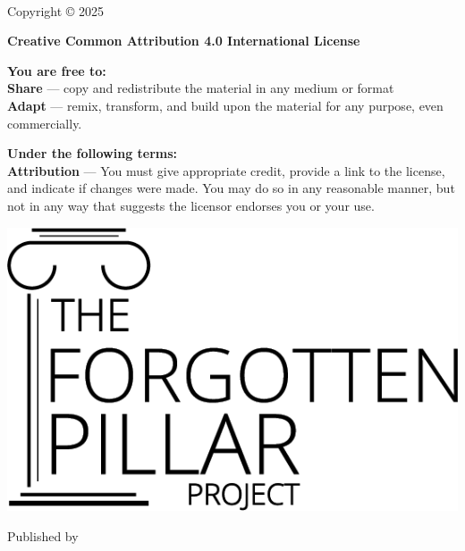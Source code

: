 \clearpage %

{\small
\setlength{\parindent}{0em}\setlength{\parskip}{1em}
~
\vfill

Copyright \copyright{} 2025 \website

\textbf{Creative Common Attribution 4.0 International License}

\textbf{You are free to:} \\
\textbf{Share} — copy and redistribute the material in any medium or format \\
\textbf{Adapt} — remix, transform, and build upon the material for any purpose, even commercially.

\textbf{Under the following terms:} \\
\textbf{Attribution} — You must give appropriate credit, provide a link to the license, and indicate if changes were made. You may do so in any reasonable manner, but not in any way that suggests the licensor endorses you or your use.


\ifx\isbn\undefined\else\if\relax\detokenize\expandafter{\isbn}\relax{}\fi\fi

\includegraphics[width=0.21\linewidth]{images/logo-black.png}

Published by \publisher{}
}
